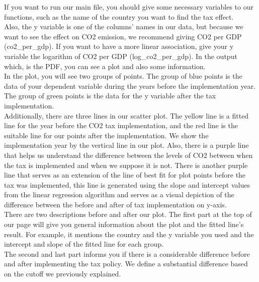 \documentclass[fontsize=11pt]{article}
\begin{document}
\noindent If you want to run our main file, you should give some necessary variables to our functions, such as the name of the country you want to find the tax effect.\\

\noindent Also, the y variable is one of the columns' names in our data, but because we want to see the effect on CO2 emission, we recommend giving CO2 per GDP (co2\_per\_gdp). If you want to have a more linear association, give your y variable the logarithm of CO2 per GDP (log\_co2\_per\_gdp). In the output which, is the PDF, you can see a plot and also some information.\\

\noindent In the plot, you will see two groups of points. The group of blue points is the data of your dependent variable during the years before the implementation year. The group of green points is the data for the y variable after the tax implementation.\\

\noindent Additionally, there are three lines in our scatter plot. The yellow line is a fitted line for the year before the CO2 tax implementation, and the red line is the suitable line for our points after the implementation. We show the implementation year by the vertical line in our plot. Also, there is a purple line that helps us understand the difference between the levels of CO2 between when the tax is implemented and when we suppose it is not. There is another purple line that serves as an extension of the line of best fit for plot points before the tax was implemented, this line is generated using the slope and intercept values from the linear regression algorithm and serves as a visual depiction of the difference between the before and after of tax implementation on y-axis. \\

\noindent There are two descriptions before and after our plot. The first part at the top of our page will give you general information about the plot and the fitted line's result. For example, it mentions the country and the y variable you used and the intercept and slope of the fitted line for each group.\\

\noindent The second and last part informs you if there is a considerable difference before and after implementing the tax policy. We define a substantial difference based on the cutoff we previously explained.\\
\end{document}

